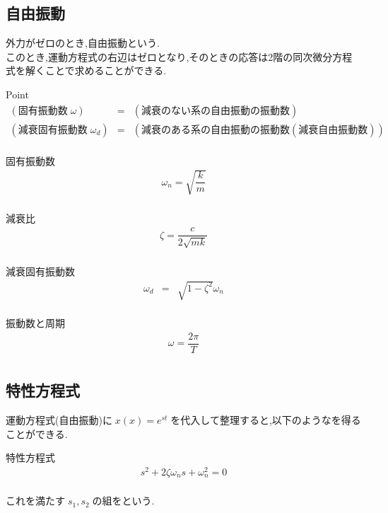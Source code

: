 \documentclass[a4paper]{jsarticle}
\begin{document}
\subsection{自由振動}
外力がゼロのとき,自由振動という.\\
このとき,運動方程式の右辺はゼロとなり,そのときの応答は2階の同次微分方程式を解くことで求めることができる.
\begin{itembox}[l]{Point}
    \begin{eqnarray*}
        (固有振動数\;\omega)&=&(減衰のない系の自由振動の振動数)\\
        (減衰固有振動数\;\omega_d)&=&(減衰のある系の自由振動の振動数(減衰自由振動数))\\
    \end{eqnarray*}
\end{itembox}
\begin{itembox}[l]{固有振動数}
    \begin{eqnarray*}
        \omega_n = \sqrt{\dfrac{k}{m}}\\
    \end{eqnarray*}
\end{itembox}
\begin{itembox}[l]{減衰比}
    \begin{eqnarray*}
        \zeta = \dfrac{c}{2\sqrt{mk}}\\
    \end{eqnarray*}
\end{itembox}
\begin{itembox}[l]{減衰固有振動数}
    \begin{eqnarray*}
        \omega_d&=&\sqrt{1-\zeta^2}\omega_n\\
    \end{eqnarray*}
\end{itembox}
\begin{itembox}[l]{振動数と周期}
    \begin{eqnarray*}
        \omega=\dfrac{2\pi}{T}\\
    \end{eqnarray*}
\end{itembox}
\subsection{特性方程式}
運動方程式(自由振動)に$\; x\left(x\right)=e^{st}\;$を代入して整理すると,以下のようなを得ることができる.
\begin{itembox}[l]{特性方程式}
    \begin{eqnarray*}
        s^2+2\zeta\omega_ns+\omega_n^2=0\\
    \end{eqnarray*}
\end{itembox}
これを満たす$\; s_1,s_2\;$の組をという.
\end{document}

